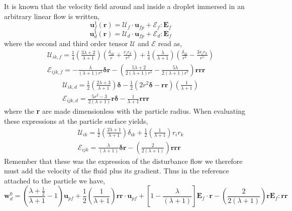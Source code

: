 It is known that the velocity field around and inside a droplet immersed in an arbitrary linear flow is written,
\begin{equation}
    \textbf{u}_f^1(\textbf{r})
    = 
    \mathcal{U}_f\cdot \textbf{u}_{fp}
    + \mathcal{E}_f: \textbf{E}_{f}
\end{equation}
\begin{equation}
    \textbf{u}_d^1(\textbf{r})
    = 
    \mathcal{U}_d\cdot \textbf{u}_{fp}
    + \mathcal{E}_d: \textbf{E}_{f}
\end{equation}
where the second and third order tensor $\mathcal{U}$ and $\mathcal{E}$ read as, 
\begin{align}
    \mathcal{U}_{ik,f} = 
    \frac{1}{4}\left(\frac{3\lambda + 2}{\lambda +1}\right)
    \left(\frac{\delta_{ik}}{r} + \frac{r_ir_k}{r^3}\right) 
    + 
    \frac{1}{4}\left(\frac{\lambda}{\lambda +1}\right)
    \left(\frac{\delta_{ik}}{r^3} - \frac{3r_ir_k}{r^5}\right)  \\
    \mathcal{E}_{ijk,f}
    =
    -\frac{\lambda}{(\lambda + 1)r^5} \bm\delta\textbf{r}
    -\left(\frac{5\lambda +2}{2(\lambda +1 )r^5} - \frac{5\lambda}{2(\lambda+1)r^7}\right) \textbf{rrr}
\end{align}
\begin{align}
    \mathcal{U}_{ik,d} = 
    \frac{1}{2}\left(\frac{2\lambda +3}{\lambda +1}\right)\bm\delta
    -\frac{1}{2} (2r^2 \bm\delta - \textbf{rr})
    \left(\frac{1}{\lambda +1}\right)\\
    \mathcal{E}_{ijk,d}
    =
    \frac{5r^2 -3}{2(\lambda +1)} \textbf{r}\bm\delta
    - \frac{1}{\lambda+1}\textbf{rrr}
\end{align}
where the \textbf{r} are made dimensionless with the particle radius. 
When evaluating these expressions at the particle surface yields, 
\begin{align}
    \mathcal{U}_{ik} = 
    \frac{1}{2}\left(\frac{2\lambda + 1}{\lambda +1}\right)
    \delta_{ik} 
    + 
    \frac{1}{2}\left(\frac{1}{\lambda +1}\right)
    r_ir_k  \\
    \mathcal{E}_{ijk}
    = 
    \frac{\lambda}{(\lambda + 1)}
    \bm\delta\textbf{r}
    -\left(\frac{2}{2(\lambda +1 )} \right) \textbf{rrr}
\end{align}
Remember that these was the expression of the disturbance flow we therefore must add the velocity of the fluid plus its gradient. 
Thus in the reference attached to the particle we have, 
\begin{equation*}
    \textbf{w}_d^0 
    = \left(\frac{\lambda + \frac{1}{2}}{\lambda +1} - 1\right)
    \textbf{u}_{pf} 
    + 
    \frac{1}{2}\left(\frac{1}{\lambda +1}\right)
    \textbf{rr} \cdot \textbf{u}_{pf} 
    + \left[1-\frac{\lambda}{(\lambda + 1)}\right]\textbf{E}_f\cdot\textbf{r}
    -\left(\frac{2}{2(\lambda +1 )} \right) \textbf{r} \textbf{E}_f:\textbf{rr}
\end{equation*}


